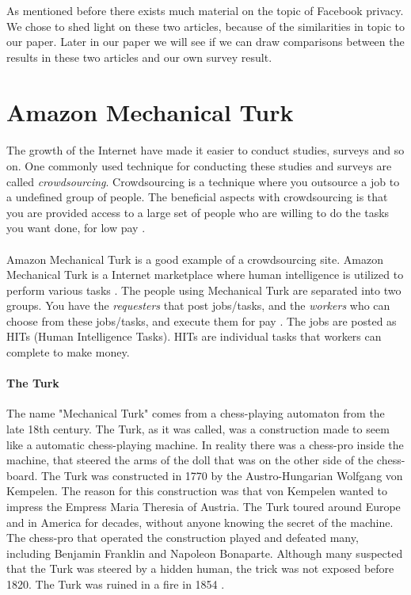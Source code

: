 As mentioned before there exists much material on the topic of Facebook privacy. We chose to shed light on these two articles, because of the similarities in topic to our paper. Later in our paper we will see if we can draw comparisons between the results in these two articles and our own survey result.

\section{Amazon Mechanical Turk}\label{sec:amt}
\paragraph{}
The growth of the Internet have made it easier to conduct studies, surveys and so on. One commonly used technique for conducting these studies and surveys are called \emph{crowdsourcing}. Crowdsourcing is a technique where you outsource a job to a undefined group of people. The beneficial aspects with crowdsourcing is that you are provided access to a large set of people who are willing to do the tasks you want done, for low pay \cite{AMT}.

\paragraph{}
Amazon Mechanical Turk is a good example of a crowdsourcing site. Amazon Mechanical Turk is a Internet marketplace where human intelligence is utilized to perform various tasks \cite{amazonweb}. The people using Mechanical Turk are separated into two groups. You have the \emph{requesters} that post jobs/tasks, and the \emph{workers} who can choose from these jobs/tasks, and execute them for pay \cite{AMT}. The jobs are posted as HITs (Human Intelligence Tasks). HITs are individual tasks that workers can complete to make money. 

\paragraph{The Turk}
The name "Mechanical Turk" comes from a chess-playing automaton from the  late 18th century. The Turk, as it was called, was a construction made to seem like a automatic chess-playing machine. In reality there was a chess-pro inside the machine, that steered the arms of the doll that was on the other side of the chess-board. The Turk was constructed in 1770 by the Austro-Hungarian Wolfgang von Kempelen. The reason for this construction was that von Kempelen wanted to impress the Empress Maria Theresia of Austria. 
The Turk toured around Europe and in America for decades, without anyone knowing the secret of the machine. The chess-pro that operated the construction played and defeated many, including Benjamin Franklin and Napoleon Bonaparte. Although many suspected that the Turk was steered by a hidden human, the trick was not exposed before 1820. The Turk was ruined in a fire in 1854 \cite{theturk}.

